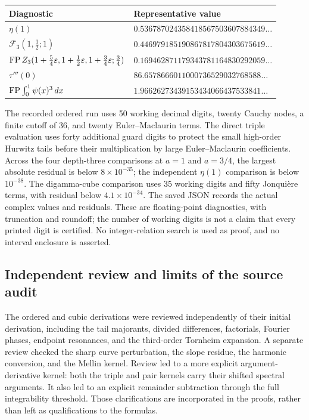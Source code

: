 \begin{center}
\small
\begin{tabular}{p{}p{}}
\toprule
Diagnostic & Representative value\\
\midrule
$\eta(1)$ & $0.536787024358418567503607884349\ldots$\\[3pt]
$\mathcal F_3(1,\tfrac12;1)$ &
 $0.446979185190867817804303675619\ldots$\\[3pt]
$\operatorname{FP} Z_3(1+\tfrac54\varepsilon,1+\tfrac12\varepsilon,
1+\tfrac34\varepsilon;\tfrac34)$ &
 $0.169462871179343781164830292059\ldots$\\[3pt]
$\tau'''(0)$ & $86.6578666011000736529032768588\ldots$\\[3pt]
$\operatorname{FP}\int_0^1\psi(x)^3\,dx$ &
 $1.96626273439153434066437533841\ldots$\\
\bottomrule
\end{tabular}
\end{center}

The recorded ordered run uses 50 working decimal digits, twenty
Cauchy nodes, a finite cutoff of 36, and twenty Euler--Maclaurin terms.
The direct triple evaluation uses forty additional guard digits to
protect the small high-order Hurwitz tails before their multiplication
by large Euler--Maclaurin coefficients.
Across the four depth-three comparisons at $a=1$ and $a=3/4$, the
largest absolute residual is below $8\times10^{-35}$; the independent
$\eta(1)$ comparison is below $10^{-38}$. The digamma-cube comparison
uses 35 working digits and fifty Jonqui\`ere terms, with residual
below $4.1\times10^{-34}$. The saved JSON records the actual complex
values and residuals. These are floating-point diagnostics, with
truncation and roundoff; the number of working digits is not a claim
that every printed digit is certified. No integer-relation search is
used as proof, and no interval enclosure is asserted.

\subsection{Independent review and limits of the source audit}

The ordered and cubic derivations were reviewed independently of
their initial derivation, including the tail majorants, divided
differences, factorials, Fourier phases, endpoint resonances, and the
third-order Tornheim expansion. A separate review checked the sharp
curve perturbation, the slope residue, the harmonic conversion, and
the Mellin kernel. Review led to a more explicit argument-derivative
kernel: both the triple and pair kernels carry their shifted spectral
arguments. It also led to an explicit remainder subtraction through
the full integrability threshold. Those clarifications are incorporated
in the proofs, rather than left as qualifications to the formulas.

